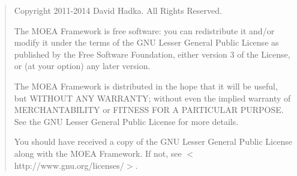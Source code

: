 \begin{quotation}
\noindent
Copyright 2011-2014 David Hadka.  All Rights Reserved.

\vspace{1em}
\noindent
The MOEA Framework is free software: you can redistribute it and/or modify
it under the terms of the GNU Lesser General Public License as published by 
the Free Software Foundation, either version 3 of the License, or (at your 
option) any later version.

\vspace{1em}
\noindent
The MOEA Framework is distributed in the hope that it will be useful, but 
WITHOUT ANY WARRANTY; without even the implied warranty of MERCHANTABILITY 
or FITNESS FOR A PARTICULAR PURPOSE.  See the GNU Lesser General Public 
License for more details.

\vspace{1em}
\noindent
You should have received a copy of the GNU Lesser General Public License 
along with the MOEA Framework.  If not, see $<$http://www.gnu.org/licenses/$>$.
\end{quotation}

